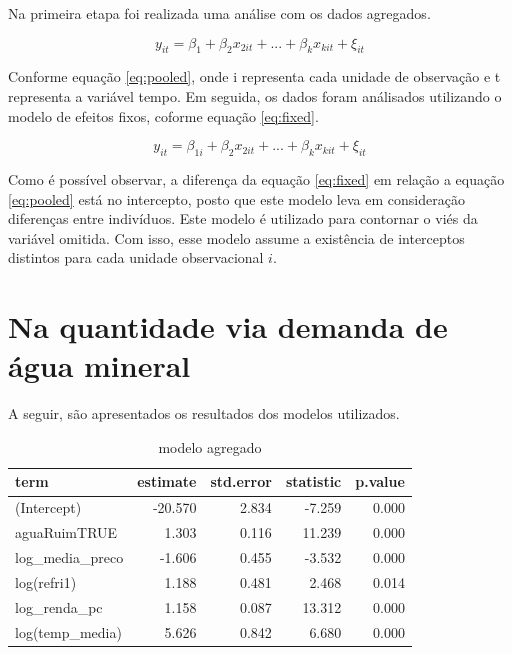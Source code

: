 \documentclass[
  12pt,
]{book}
\begin{document}
Na primeira etapa foi realizada uma análise com os dados agregados.

\begin{equation} 
  y_{it} = \beta_{1} + \beta_{2}x_{2it} + ... + \beta_{k}x_{kit} + \xi_{it}
  \label{eq:pooled}
\end{equation}

Conforme equação \eqref{eq:pooled}, onde i representa cada unidade de observação e t representa a variável tempo. Em seguida, os dados foram análisados utilizando o modelo de efeitos fixos, coforme equação \eqref{eq:fixed}.

\begin{equation} 
  y_{it} = \beta_{1i} + \beta_{2}x_{2it} + ... + \beta_{k}x_{kit} + \xi_{it}
  \label{eq:fixed}
\end{equation}

Como é possível observar, a diferença da equação \eqref{eq:fixed} em relação a equação \eqref{eq:pooled} está no intercepto, posto que este modelo leva em consideração diferenças entre indivíduos. Este modelo é utilizado para contornar o viés da variável omitida. Com isso, esse modelo assume a existência de interceptos distintos para cada unidade observacional \(i\).

\hypertarget{na-quantidade-via-demanda-de-uxe1gua-mineral}{%
\section{Na quantidade via demanda de água mineral}\label{na-quantidade-via-demanda-de-uxe1gua-mineral}}

A seguir, são apresentados os resultados dos modelos utilizados.

\begin{table}

\caption{\label{tab:demagreg}modelo agregado}
\centering
\begin{tabular}[t]{l|r|r|r|r}
\hline
term & estimate & std.error & statistic & p.value\\
\hline
(Intercept) & -20.570 & 2.834 & -7.259 & 0.000\\
\hline
aguaRuimTRUE & 1.303 & 0.116 & 11.239 & 0.000\\
\hline
log\_media\_preco & -1.606 & 0.455 & -3.532 & 0.000\\
\hline
log(refri1) & 1.188 & 0.481 & 2.468 & 0.014\\
\hline
log\_renda\_pc & 1.158 & 0.087 & 13.312 & 0.000\\
\hline
log(temp\_media) & 5.626 & 0.842 & 6.680 & 0.000\\
\hline
\end{tabular}
\end{table}
\end{document}
